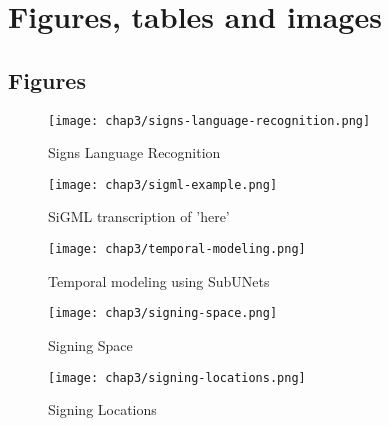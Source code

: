 \chapter{Figures, tables and images} \label{chap-2}

\section{Figures}

\begin{figure}[hbt!]
\center
\texttt{[image: chap3/signs-language-recognition.png]} 
\caption{Signs Language Recognition}
\label{fig-slr}
\end{figure}

\begin{figure}[hbt!]
\center
\texttt{[image: chap3/sigml-example.png]} 
\caption{SiGML transcription of 'here'}
\label{fig-sigml}
\end{figure}

\begin{figure}[hbt!]
\center
\texttt{[image: chap3/temporal-modeling.png]} 
\caption{Temporal modeling using SubUNets}
\label{temporal-modeling}
\end{figure}

\begin{figure}[hbt!]
\center
\texttt{[image: chap3/signing-space.png]} 
\caption{Signing Space}
\label{fig-signing-space}
\end{figure}

\begin{figure}[hbt!]
\center
\texttt{[image: chap3/signing-locations.png]} 
\caption{Signing Locations}
\label{fig-signing-locations}
\end{figure}

